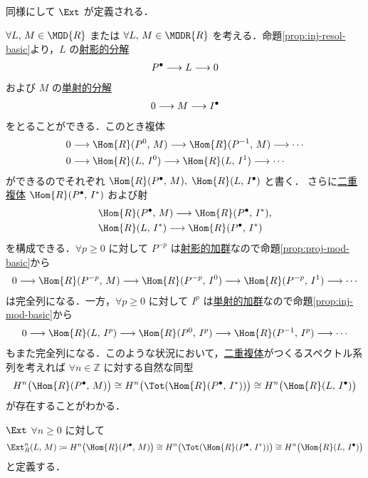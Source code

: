 \documentclass[algtopo_main]{subfiles}
\begin{document}
同様にして $\Ext$ が定義される．

$\forall L,\, M \in \MOD{R}$ または $\forall L,\, M \in \MODR{R}$ を考える．命題\ref{prop:inj-resol-basic}より，$L$ の\hyperref[def:projective-resolution]{射影的分解}
\begin{align}
    P^\bullet \longrightarrow L \longrightarrow 0
\end{align}
および $M$ の\hyperref[def:injective-resolution]{単射的分解}
\begin{align}
    0\longrightarrow M \longrightarrow I^\bullet
\end{align}
をとることができる．このとき複体
\begin{align}
    0 &\lto \Hom{R} (P^0,\, M) \lto \Hom{R} (P^{-1},\, M) \lto \cdots \\
    0 &\lto \Hom{R} (L,\, I^0) \lto \Hom{R} (L,\, I^1) \lto \cdots
\end{align}
ができるのでそれぞれ $\Hom{R}(P^\bullet,\, M),\; \Hom{R}(L,\, I^\bullet)$ と書く．
さらに\hyperref[def:double-complex]{二重複体} $\Hom{R} (P^\bullet,\, I^*)$ および射
\begin{align}
    &\Hom{R} (P^\bullet,\, M) \lto \Hom{R}(P^\bullet,\, I^*), \\
    &\Hom{R} (L,\, I^*) \lto \Hom{R}(P^\bullet,\, I^*)
\end{align}
を構成できる．$\forall p \ge 0$ に対して $P^{-p}$ は\hyperref[def:proj-mod]{射影的加群}なので命題\ref{prop:proj-mod-basic}から
\begin{align}
    0 \lto \Hom{R} (P^{-p},\, M) \lto \Hom{R} (P^{-p},\, I^0) \lto \Hom{R} (P^{-p},\, I^1) \lto \cdots
\end{align}
は完全列になる．一方，$\forall p \ge 0$ に対して $I^{p}$ は\hyperref[def:inj-mod]{単射的加群}なので命題\ref{prop:inj-mod-basic}から
\begin{align}
    0 \lto \Hom{R} (L,\, I^p) \lto \Hom{R} (P^0,\, I^p) \lto \Hom{R} (P^{-1},\, I^p) \lto \cdots
\end{align}
もまた完全列になる．このような状況において，\hyperref[def:double-complex]{二重複体}がつくるスペクトル系列を考えれば $\forall n \in \mathbb{Z}$ に対する自然な同型
\begin{align}
    \label{eq:spectral-isom-Ext}
    H^n \bigl(\Hom{R}(P^\bullet,\, M)\bigr) \cong H^n \bigl(\Tot (\Hom{R}(P^\bullet,\, I^*))\bigr) \cong H^n \bigl( \Hom{R} (L,\, I^\bullet) \bigr) 
\end{align}
が存在することがわかる．

\begin{mydef}[label=def:Ext]{$\Ext$}
    $\forall n \ge 0$ に対して
    \begin{align}
        \Ext^n_R (L,\, M) \coloneqq H^n \bigl(\Hom{R}(P^\bullet,\, M)\bigr) \cong H^n \bigl(\Tot (\Hom{R}(P^\bullet,\, I^*))\bigr) \cong H^n \bigl( \Hom{R} (L,\, I^\bullet) \bigr) 
    \end{align}
    と定義する．
\end{mydef}
\end{document}
